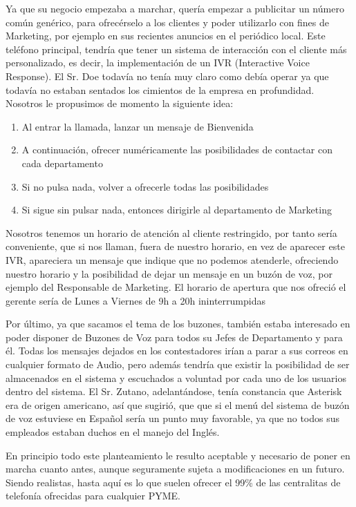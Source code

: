 Ya que su negocio empezaba a marchar, quería empezar a publicitar un número común genérico, para ofrecérselo a los clientes y poder utilizarlo con fines de Marketing, por ejemplo en sus recientes anuncios en el periódico local. Este teléfono principal, tendría que tener un sistema de interacción con el cliente más personalizado, es decir, la implementación de un IVR (Interactive Voice Response). El Sr. Doe todavía no tenía muy claro como debía operar ya que todavía no estaban sentados los cimientos de la empresa en profundidad. Nosotros le propusimos de momento la siguiente idea:

\begin{enumerate}

\item Al entrar la llamada, lanzar un mensaje de Bienvenida
\item A continuación, ofrecer numéricamente las posibilidades de contactar con cada departamento
\item Si no pulsa nada, volver a ofrecerle todas las posibilidades
\item Si sigue sin pulsar nada, entonces dirigirle al departamento de Marketing

\end{enumerate}

Nosotros tenemos un horario de atención al cliente restringido, por tanto sería conveniente, que si nos llaman, fuera de nuestro horario, en vez de aparecer este IVR, apareciera un mensaje que indique que no podemos atenderle, ofreciendo nuestro horario y la posibilidad de dejar un mensaje en un buzón de voz, por ejemplo del Responsable de Marketing. El horario de apertura que nos ofreció el gerente sería de Lunes a Viernes de 9h a 20h ininterrumpidas

Por último, ya que sacamos el tema de los buzones, también estaba interesado en poder disponer de Buzones de Voz para todos su Jefes de Departamento y para él. Todas los mensajes dejados en los contestadores irían a parar a sus correos en cualquier formato de Audio, pero además tendría que existir la posibilidad de ser almacenados en el sistema y escuchados a voluntad por cada uno de los usuarios dentro del sistema. El Sr. Zutano, adelantándose, tenía constancia que Asterisk era de origen americano, así que sugirió, que que si el menú del sistema de buzón de voz estuviese en Español sería un punto muy favorable, ya que no todos sus empleados estaban duchos en el manejo del Inglés.

En principio todo este planteamiento le resulto aceptable y necesario de poner en marcha cuanto antes, aunque seguramente sujeta a modificaciones en un futuro. Siendo realistas, hasta aquí es lo que suelen ofrecer el 99\% de las centralitas de telefonía ofrecidas para cualquier PYME.

